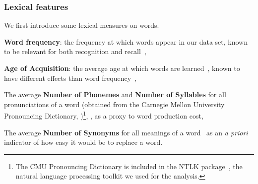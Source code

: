 \subsubsection{Lexical features}

We first introduce some lexical measures on words.

\begin{APAitemize}

    \item \textbf{Word frequency}: the frequency at which words appear in our data set, known to be relevant for both recognition and recall~\citep{gregg_word_1976},

    \item \textbf{Age of Acquisition}: the average age at which words are learned~\citep[obtained from][]{kuperman_age--acquisition_2012}, known to have different effects than word frequency~\citep{morrison_roles_1995,dewhurst_separate_1998},

    \item {}

    \item The average \textbf{Number of Phonemes} and \textbf{Number of Syllables} for all pronunciations of a word (obtained from the Carnegie Mellon University Pronouncing Dictionary, \citealp{weide_cmu_1998})\footnote{
    The CMU Pronouncing Dictionary is included in the NTLK package~\citep{bird_nltk_2009}, the natural language processing toolkit we used for the analysis.
    },
    , as a proxy to word production cost,

    \item The average \textbf{Number of Synonyms} for all meanings of a word~\citep[obtained from][]{wordnet_princeton_2010} as an \emph{a priori} indicator of how easy it would be to replace a word.

\end{APAitemize}


\medskip


